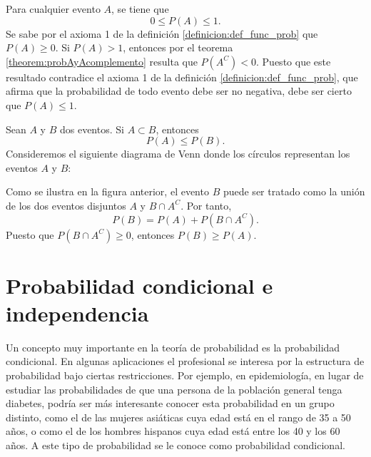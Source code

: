 \begin{theorem}{}{}
    Para cualquier evento $A$, se tiene que 
    $$0 \leq P(A) \leq 1.$$
    \tcblower
    \demostracion Se sabe por el axioma 1 de la definición \ref{definicion:def_func_prob} que $P(A) \geq 0$. Si $P(A) > 1$, entonces por el teorema \ref{theorem:probAyAcomplemento} resulta que $P\left(A^C\right) < 0$. Puesto que este resultado contradice el axioma 1 de la definición \ref{definicion:def_func_prob}, que afirma que la probabilidad de todo evento debe ser no negativa, debe ser cierto que $P(A) \leq 1$.
\end{theorem}

\begin{theorem}{}{}
    Sean $A$ y $B$ dos eventos. Si $A \subset B$, entonces
    $$P(A) \leq P(B).$$
    \tcblower
    \demostracion Consideremos el siguiente diagrama de Venn donde los círculos representan los eventos $A$ y $B$:
    \begin{center}
        \captionsetup*[figure]{hypcap=false}%
    \end{center}
    Como se ilustra en la figura anterior, el evento $B$ puede ser tratado como la unión de los dos eventos disjuntos $A$ y $B \cap A^C$. Por tanto,
    $$P(B) = P(A) + P\left(B \cap A^C\right).$$
    Puesto que $P\left(B \cap A^C\right) \geq 0$, entonces $P(B) \geq P(A)$.
\end{theorem}

\section{Probabilidad condicional e independencia}

Un concepto muy importante en la teoría de probabilidad es la probabilidad condicional. En algunas aplicaciones el profesional se interesa por la estructura de probabilidad bajo ciertas restricciones. Por ejemplo, en epidemiología, en lugar de estudiar las probabilidades de que una persona de la población general tenga diabetes, podría ser más interesante conocer esta probabilidad en un grupo distinto, como el de las mujeres asiáticas cuya edad está en el rango de 35 a 50 años, o como el de los hombres hispanos cuya edad está entre los 40 y los 60 años. A este tipo de probabilidad se le conoce como probabilidad condicional.

